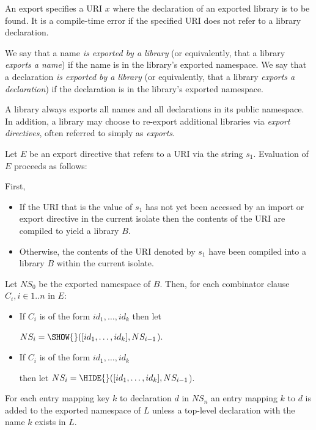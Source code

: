 \documentclass{article}
\newcommand{\code}[1]{{\sf #1}}
\begin{document}
\LMHash{}
 An export specifies a URI $x$ where the declaration of an exported library is to be found.  It is a compile-time error if  the specified URI does not refer to a library declaration.  

\LMHash{}
We say that a name {\em is exported by a library} (or equivalently, that a library {\em exports a name}) if the name is in the library's exported namespace. We say that a declaration {\em is exported by a library} (or equivalently, that a library {\em exports a declaration}) if the declaration is in the library's exported namespace.

\LMHash{}
A library always exports all names and all declarations in its public namespace. In addition, a library may choose to re-export additional libraries via {\em export directives}, often referred to simply as {\em exports}.

\LMHash{}
Let $E$ be an export directive that refers to a URI via the string $s_1$. Evaluation of $E$  proceeds as follows:

\LMHash{}
First,

 \begin{itemize}
 \item
If  the URI that is the value of $s_1$ has not yet been accessed by an import or export directive  in the current isolate then the contents of the URI  are compiled to yield a library $B$.
\item Otherwise, the contents of the URI denoted by $s_1$ have been compiled into a library $B$ within the current isolate.
\end{itemize}


\LMHash{}
Let $NS_0$ be the exported namespace of $B$. Then, for each combinator clause $C_i, i \in 1..n$ in $E$:
\begin{itemize}
\item If $C_i$ is of the form \code{\SHOW{} $id_1, \ldots, id_k$} then let 

$NS_i = \SHOW{}([id_1, \ldots, id_k], NS_{i-1}$).  
\item If $C_i$ is of the form \code{\HIDE{} $id_1, \ldots, id_k$} 

then let $NS_i = \HIDE{}([id_1, \ldots, id_k], NS_{i-1}$). 
\end{itemize}

\LMHash{}
For each
entry mapping key $k$ to declaration $d$ in $NS_n$ an entry mapping $k$ to $d$ is added to the exported namespace of $L$ unless a  top-level declaration with the name $k$ exists in $L$.  
\end{document}
